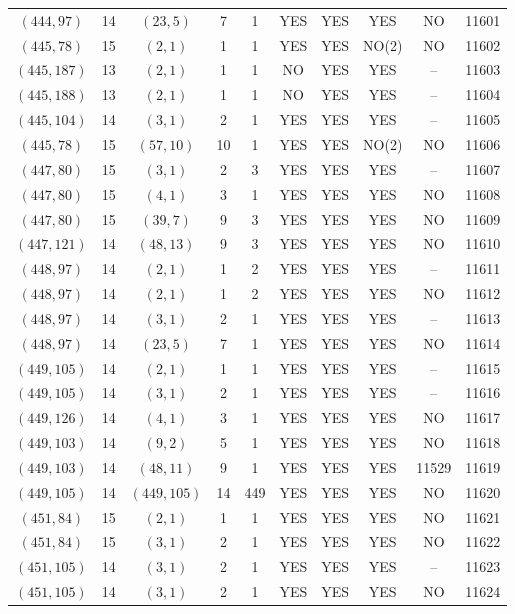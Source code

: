 \begin{longtable}{|c|c|c|c|c|c|c|c|c|c|}
$(444, 97)$ & 14 & $(23, 5)$ & 7 & 1 & YES & YES & YES & NO & 11601\\
$(445, 78)$ & 15 & $(2, 1)$ & 1 & 1 & YES & YES & NO(2) & NO & 11602\\
$(445, 187)$ & 13 & $(2, 1)$ & 1 & 1 & NO & YES & YES & -- & 11603\\
$(445, 188)$ & 13 & $(2, 1)$ & 1 & 1 & NO & YES & YES & -- & 11604\\
$(445, 104)$ & 14 & $(3, 1)$ & 2 & 1 & YES & YES & YES & -- & 11605\\
$(445, 78)$ & 15 & $(57, 10)$ & 10 & 1 & YES & YES & NO(2) & NO & 11606\\
$(447, 80)$ & 15 & $(3, 1)$ & 2 & 3 & YES & YES & YES & -- & 11607\\
$(447, 80)$ & 15 & $(4, 1)$ & 3 & 1 & YES & YES & YES & NO & 11608\\
$(447, 80)$ & 15 & $(39, 7)$ & 9 & 3 & YES & YES & YES & NO & 11609\\
$(447, 121)$ & 14 & $(48, 13)$ & 9 & 3 & YES & YES & YES & NO & 11610\\
$(448, 97)$ & 14 & $(2, 1)$ & 1 & 2 & YES & YES & YES & -- & 11611\\
$(448, 97)$ & 14 & $(2, 1)$ & 1 & 2 & YES & YES & YES & NO & 11612\\
$(448, 97)$ & 14 & $(3, 1)$ & 2 & 1 & YES & YES & YES & -- & 11613\\
$(448, 97)$ & 14 & $(23, 5)$ & 7 & 1 & YES & YES & YES & NO & 11614\\
$(449, 105)$ & 14 & $(2, 1)$ & 1 & 1 & YES & YES & YES & -- & 11615\\
$(449, 105)$ & 14 & $(3, 1)$ & 2 & 1 & YES & YES & YES & -- & 11616\\
$(449, 126)$ & 14 & $(4, 1)$ & 3 & 1 & YES & YES & YES & NO & 11617\\
$(449, 103)$ & 14 & $(9, 2)$ & 5 & 1 & YES & YES & YES & NO & 11618\\
$(449, 103)$ & 14 & $(48, 11)$ & 9 & 1 & YES & YES & YES & 11529 & 11619\\
$(449, 105)$ & 14 & $(449, 105)$ & 14 & 449 & YES & YES & YES & NO & 11620\\
$(451, 84)$ & 15 & $(2, 1)$ & 1 & 1 & YES & YES & YES & NO & 11621\\
$(451, 84)$ & 15 & $(3, 1)$ & 2 & 1 & YES & YES & YES & NO & 11622\\
$(451, 105)$ & 14 & $(3, 1)$ & 2 & 1 & YES & YES & YES & -- & 11623\\
$(451, 105)$ & 14 & $(3, 1)$ & 2 & 1 & YES & YES & YES & NO & 11624\\

\end{longtable}
